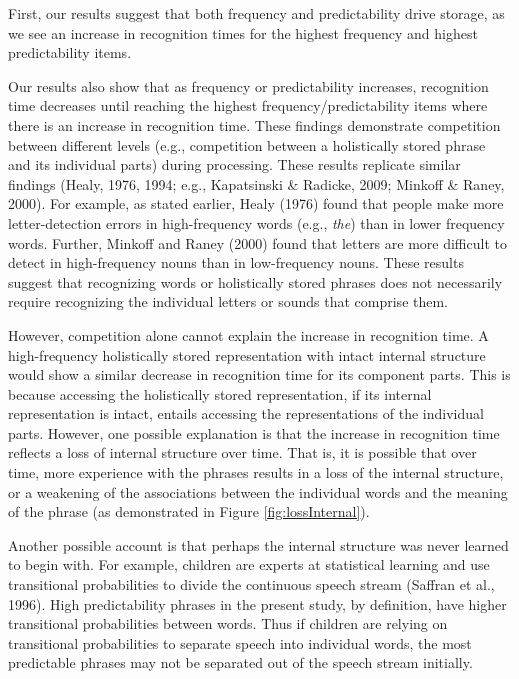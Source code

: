 \documentclass[
  man,floatsintext]{apa6}
\begin{document}
First, our results suggest that both frequency and predictability drive storage, as we see an increase in recognition times for the highest frequency and highest predictability items.

Our results also show that as frequency or predictability increases, recognition time decreases until reaching the highest frequency/predictability items where there is an increase in recognition time. These findings demonstrate competition between different levels (e.g., competition between a holistically stored phrase and its individual parts) during processing. These results replicate similar findings (Healy, 1976, 1994; e.g., Kapatsinski \& Radicke, 2009; Minkoff \& Raney, 2000). For example, as stated earlier, Healy (1976) found that people make more letter-detection errors in high-frequency words (e.g., \emph{the}) than in lower frequency words. Further, Minkoff and Raney (2000) found that letters are more difficult to detect in high-frequency nouns than in low-frequency nouns. These results suggest that recognizing words or holistically stored phrases does not necessarily require recognizing the individual letters or sounds that comprise them.

However, competition alone cannot explain the increase in recognition time. A high-frequency holistically stored representation with intact internal structure would show a similar decrease in recognition time for its component parts. This is because accessing the holistically stored representation, if its internal representation is intact, entails accessing the representations of the individual parts. However, one possible explanation is that the increase in recognition time reflects a loss of internal structure over time. That is, it is possible that over time, more experience with the phrases results in a loss of the internal structure, or a weakening of the associations between the individual words and the meaning of the phrase (as demonstrated in Figure \ref{fig:lossInternal}).

Another possible account is that perhaps the internal structure was never learned to begin with. For example, children are experts at statistical learning and use transitional probabilities to divide the continuous speech stream (Saffran et al., 1996). High predictability phrases in the present study, by definition, have higher transitional probabilities between words. Thus if children are relying on transitional probabilities to separate speech into individual words, the most predictable phrases may not be separated out of the speech stream initially.
\end{document}
